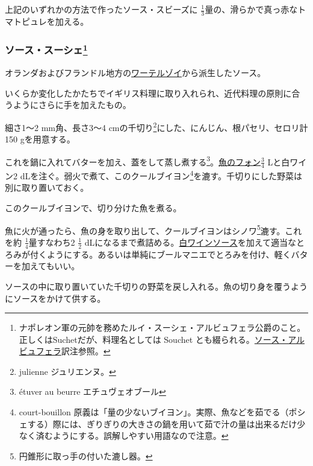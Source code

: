 \begin{recette}
上記のいずれかの方法で作ったソース・スビーズに
\(\frac{1}{3}\)量の、滑らかで真っ赤なトマトピュレを加える。

\atoaki{}

\hypertarget{sauce-souchet}{%
\subsubsection[ソース・スーシェ]{\texorpdfstring{ソース・スーシェ\footnote{ナポレオン軍の元帥を務めたルイ・スーシェ・アルビュフェラ公爵のこと。
  正しくはSuchetだが、料理名としては Souchet
  とも綴られる。\protect\hyperlink{sauce-albufera}{ソース・アルビュフェラ}訳注参照。}}{ソース・スーシェ}}\label{sauce-souchet}}


 

オランダおよびフランドル地方の\protect\hyperlink{}{ワーテルゾイ}から派生したソース。

いくらか変化したかたちでイギリス料理に取り入れられ、近代料理の原則に合うようにさらに手を加えたもの。

細さ1〜2 mm角、長さ3〜4 cmの千切り\footnote{julienne ジュリエンヌ。}にした、にんじん、根パセリ、セロリ計150
gを用意する。

これを鍋に入れてバターを加え、蓋をして蒸し煮する\footnote{étuver au
  beurre エチュヴェオブール}。\protect\hyperlink{fumet-de-poisson}{魚のフォン}\(\frac{3}{4}\)
Lと白ワイン2 dLを注ぐ。弱火で煮て、このクールブイヨン\footnote{court-bouillon
  原義は「量の少ないブイヨン」。実際、魚などを茹でる（ポシェする）際には、ぎりぎりの大きさの鍋を用いて茹で汁の量は出来るだけ少なく済むようにする。誤解しやすい用語なので注意。}を漉す。千切りにした野菜は別に取り置いておく。

このクールブイヨンで、切り分けた魚を煮る。

魚に火が通ったら、魚の身を取り出して、クールブイヨンはシノワ\footnote{円錐形に取っ手の付いた漉し器。}漉す。これを約
\(\frac{1}{4}\)量すなわち2 \(\frac{1}{2}\)
dLになるまで煮詰める。\protect\hyperlink{sauce-vin-blanc}{白ワインソース}を加えて適当なとろみが付くようにする。あるいは単純にブールマニエでとろみを付け、軽くバターを加えてもいい。

ソースの中に取り置いていた千切りの野菜を戻し入れる。魚の切り身を覆うようにソースをかけて供する。


\end{recette}
